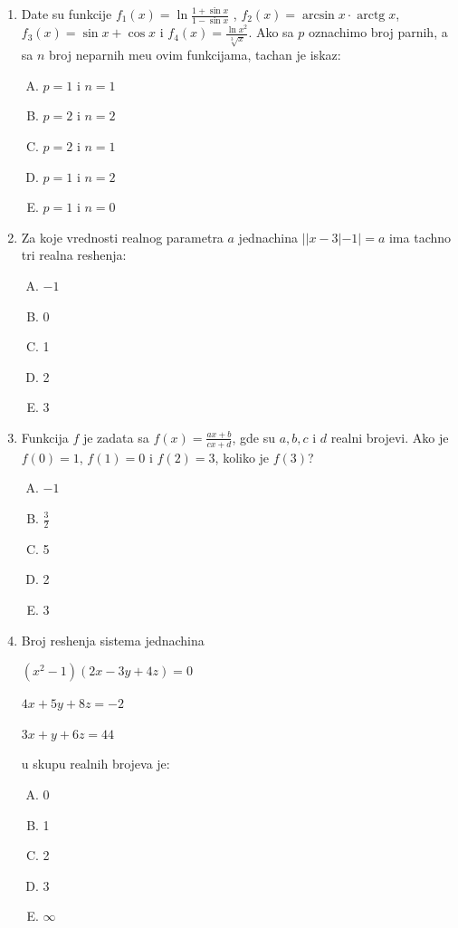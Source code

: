\documentclass[a4paper,12pt]{article}
\newcommand{\Lat}{\fontencoding{OT1}\selectfont}
\renewcommand{\arctg}{\operatorname{arctg}}
\begin{document}
\begin{enumerate}[1.]
\item Date su funkcije  $ f_1(x) = \ln \frac{1 + \sin{x}}{1 - \sin{x}}$ , $ f_2(x) = \arcsin{x} \cdot \arctg{x} $, $ f_3(x) = \sin{x} + \cos{x} $ i $f_4(x) = \frac{\ln{x^2}}{\sqrt[3]{x}} $. Ako sa $p$ oznachimo broj parnih, a sa $n$ broj neparnih me\dj{}u ovim funkcijama, tachan je iskaz:
{\Lat
\begin{multicols}{3}
\begin{enumerate}[A)]
\item $p = 1$ i $n = 1$ \item $p = 2$ i $n = 2$ \item $p = 2$ i $n = 1$ \item $p = 1$ i $n = 2$ \item $p = 1$ i $n = 0$
\end{enumerate}
\end{multicols}
}



\item Za koje vrednosti realnog parametra $a$ jednachina $||x-3|-1|=a$ ima tachno tri realna reshenja:
{\Lat
\begin{multicols}{5}
\begin{enumerate}[A)]
\item $-1$ \item 0 \item 1 \item 2 \item 3
\end{enumerate}
\end{multicols}
}


\item Funkcija $f$ je zadata sa $f(x) = \frac{ax +b}{cx+d} $, gde su $a,b,c$ i $d$ realni brojevi. Ako je $f(0) = 1$,  $f(1) = 0$ i  $f(2) = 3$, koliko je  $f(3)$?
{\Lat
\begin{multicols}{5}
\begin{enumerate}[A)]
\item $-1$ \item $\frac{3}{2}$ \item 5 \item 2 \item 3
\end{enumerate}
\end{multicols}
}


\item Broj reshenja sistema jednachina 
\par $(x^{2} - 1)(2x -3y + 4z) = 0$
\par $4x + 5y +8z = -2$
\par $3x + y + 6z = 44$
\par u skupu realnih brojeva je: 
{\Lat
\begin{multicols}{5}
\begin{enumerate}[A)]
\item 0 \item 1 \item 2 \item 3 \item $\infty$
\end{enumerate}
\end{multicols}
}


\end{enumerate}
\end{document}
